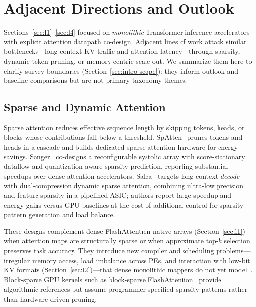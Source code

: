 \documentclass[conference]{IEEEtran}
\begin{document}
\section{Adjacent Directions and Outlook}
\label{sec:adjacent}

Sections~\ref{sec:l1}--\ref{sec:l4} focused on \emph{monolithic} Transformer inference accelerators with explicit attention datapath co-design.
Adjacent lines of work attack similar bottlenecks---long-context KV traffic and attention latency---through sparsity, dynamic token pruning, or memory-centric scale-out.
We summarize them here to clarify survey boundaries (Section~\ref{sec:intro-scope}): they inform outlook and baseline comparisons but are not primary taxonomy themes.

\subsection{Sparse and Dynamic Attention}
\label{sec:adjacent-sparse}

Sparse attention reduces effective sequence length by skipping tokens, heads, or blocks whose contributions fall below a threshold.
SpAtten~\cite{wang2021spatten} prunes tokens and heads in a cascade and builds dedicated sparse-attention hardware for energy savings.
Sanger~\cite{liu2021sanger} co-designs a reconfigurable systolic array with score-stationary dataflow and quantization-aware sparsity prediction, reporting substantial speedups over dense attention accelerators.
Salca~\cite{salca2026} targets long-context \emph{decode} with dual-compression dynamic sparse attention, combining ultra-low precision and feature sparsity in a pipelined ASIC; authors report large speedup and energy gains versus GPU baselines at the cost of additional control for sparsity pattern generation and load balance.

These designs complement dense FlashAttention-native arrays (Section~\ref{sec:l1}) when attention maps are structurally sparse or when approximate top-$k$ selection preserves task accuracy.
They introduce new compiler and scheduling problems---irregular memory access, load imbalance across PEs, and interaction with low-bit KV formats (Section~\ref{sec:l2})---that dense monolithic mappers do not yet model~\cite{liu2021sanger,salca2026,parashar2019timeloop}.
Block-sparse GPU kernels such as block-sparse FlashAttention~\cite{dao2022flashattention_sparse} provide algorithmic references but assume programmer-specified sparsity patterns rather than hardware-driven pruning.
\end{document}
